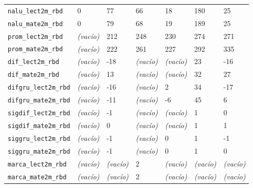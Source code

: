 \documentclass[10pt]{article}
\begin{document}
\begin{xltabular}{\linewidth}{@{}p{4.3cm} Y Y Y Y Y Y @{}}
\texttt{nalu\_\allowbreak{}lect2m\_\allowbreak{}rbd} & 0 & 77 & 66 & 18 & 180 & 25 \\
\texttt{nalu\_\allowbreak{}mate2m\_\allowbreak{}rbd} & 0 & 79 & 68 & 19 & 189 & 25 \\
\texttt{prom\_\allowbreak{}lect2m\_\allowbreak{}rbd} & \textit{\color{gris}(vacío)} & 212 & 248 & 230 & 274 & 271 \\
\texttt{prom\_\allowbreak{}mate2m\_\allowbreak{}rbd} & \textit{\color{gris}(vacío)} & 222 & 261 & 227 & 292 & 335 \\
\texttt{dif\_\allowbreak{}lect2m\_\allowbreak{}rbd} & \textit{\color{gris}(vacío)} & -{}18 & \textit{\color{gris}(vacío)} & \textit{\color{gris}(vacío)} & 23 & -{}16 \\
\texttt{dif\_\allowbreak{}mate2m\_\allowbreak{}rbd} & \textit{\color{gris}(vacío)} & 13 & \textit{\color{gris}(vacío)} & \textit{\color{gris}(vacío)} & 32 & 27 \\
\texttt{difgru\_\allowbreak{}lect2m\_\allowbreak{}rbd} & \textit{\color{gris}(vacío)} & -{}16 & \textit{\color{gris}(vacío)} & 2 & 34 & -{}17 \\
\texttt{difgru\_\allowbreak{}mate2m\_\allowbreak{}rbd} & \textit{\color{gris}(vacío)} & -{}11 & \textit{\color{gris}(vacío)} & -{}6 & 45 & 6 \\
\texttt{sigdif\_\allowbreak{}lect2m\_\allowbreak{}rbd} & \textit{\color{gris}(vacío)} & -{}1 & \textit{\color{gris}(vacío)} & \textit{\color{gris}(vacío)} & 1 & 0 \\
\texttt{sigdif\_\allowbreak{}mate2m\_\allowbreak{}rbd} & \textit{\color{gris}(vacío)} & 0 & \textit{\color{gris}(vacío)} & \textit{\color{gris}(vacío)} & 1 & 1 \\
\texttt{siggru\_\allowbreak{}lect2m\_\allowbreak{}rbd} & \textit{\color{gris}(vacío)} & -{}1 & \textit{\color{gris}(vacío)} & 0 & 1 & -{}1 \\
\texttt{siggru\_\allowbreak{}mate2m\_\allowbreak{}rbd} & \textit{\color{gris}(vacío)} & -{}1 & \textit{\color{gris}(vacío)} & 0 & 1 & 0 \\
\texttt{marca\_\allowbreak{}lect2m\_\allowbreak{}rbd} & \textit{\color{gris}(vacío)} & \textit{\color{gris}(vacío)} & 2 & \textit{\color{gris}(vacío)} & \textit{\color{gris}(vacío)} & \textit{\color{gris}(vacío)} \\
\texttt{marca\_\allowbreak{}mate2m\_\allowbreak{}rbd} & \textit{\color{gris}(vacío)} & \textit{\color{gris}(vacío)} & 2 & \textit{\color{gris}(vacío)} & \textit{\color{gris}(vacío)} & \textit{\color{gris}(vacío)} \\

\end{xltabular}
\end{document}
